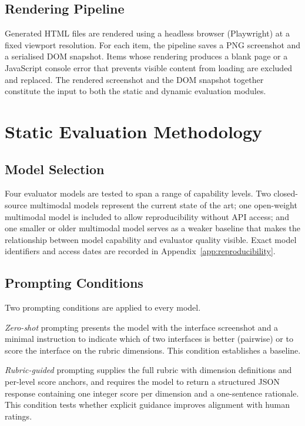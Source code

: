 \subsection{Rendering Pipeline}

Generated HTML files are rendered using a headless browser
(Playwright) at a fixed viewport resolution.
For each item, the pipeline saves a PNG screenshot and a serialised
DOM snapshot.
Items whose rendering produces a blank page or a JavaScript console
error that prevents visible content from loading are excluded and
replaced.
The rendered screenshot and the DOM snapshot together constitute
the input to both the static and dynamic evaluation modules.

\section{Static Evaluation Methodology}
\label{sec:static-method}

\subsection{Model Selection}

Four evaluator models are tested to span a range of capability levels.
Two closed-source multimodal models represent the current
state of the art; one open-weight multimodal model is included to
allow reproducibility without API access; and one smaller or older
multimodal model serves as a weaker baseline that makes the
relationship between model capability and evaluator quality visible.
Exact model identifiers and access dates are recorded in
Appendix~\ref{app:reproducibility}.

\subsection{Prompting Conditions}

Two prompting conditions are applied to every model.

\textit{Zero-shot} prompting presents the model with the interface
screenshot and a minimal instruction to indicate which of two
interfaces is better (pairwise) or to score the interface on the
rubric dimensions.
This condition establishes a baseline.

\textit{Rubric-guided} prompting supplies the full rubric with
dimension definitions and per-level score anchors, and requires the
model to return a structured JSON response containing one integer score
per dimension and a one-sentence rationale.
This condition tests whether explicit guidance improves alignment with
human ratings.


